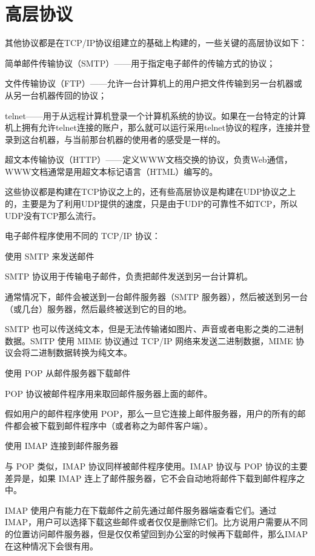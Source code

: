 \section{高层协议}

其他协议都是在TCP/IP协议组建立的基础上构建的，一些关键的高层协议如下：

\begin{compactitem}
\item 简单邮件传输协议（SMTP）——用于指定电子邮件的传输方式的协议；
\item 文件传输协议（FTP）——允许一台计算机上的用户把文件传输到另一台机器或从另一台机器传回的协议；
\item telnet——用于从远程计算机登录一个计算机系统的协议。如果在一台特定的计算机上拥有允许telnet连接的账户，那么就可以运行采用telnet协议的程序，连接并登录到这台机器，与当前那台机器的使用者的感受是一样的。
\item 超文本传输协议（HTTP）——定义WWW文档交换的协议，负责Web通信，WWW文档通常是用超文本标记语言（HTML）编写的。
\end{compactitem}

这些协议都是构建在TCP协议之上的，还有些高层协议是构建在UDP协议之上的，主要是为了利用UDP提供的速度，只是由于UDP的可靠性不如TCP，所以UDP没有TCP那么流行。

电子邮件程序使用不同的 TCP/IP 协议：
\begin{compactitem}
\item 使用 SMTP 来发送邮件

SMTP 协议用于传输电子邮件，负责把邮件发送到另一台计算机。

通常情况下，邮件会被送到一台邮件服务器（SMTP 服务器），然后被送到另一台（或几台）服务器，然后最终被送到它的目的地。

SMTP 也可以传送纯文本，但是无法传输诸如图片、声音或者电影之类的二进制数据。SMTP 使用 MIME 协议通过 TCP/IP 网络来发送二进制数据，MIME 协议会将二进制数据转换为纯文本。
\item 使用 POP 从邮件服务器下载邮件

POP 协议被邮件程序用来取回邮件服务器上面的邮件。

假如用户的邮件程序使用 POP，那么一旦它连接上邮件服务器，用户的所有的邮件都会被下载到邮件程序中（或者称之为邮件客户端）。
\item 使用 IMAP 连接到邮件服务器

与 POP 类似，IMAP 协议同样被邮件程序使用。IMAP 协议与 POP 协议的主要差异是，如果 IMAP 连上了邮件服务器，它不会自动地将邮件下载到邮件程序之中。

IMAP 使用户有能力在下载邮件之前先通过邮件服务器端查看它们。通过 IMAP，用户可以选择下载这些邮件或者仅仅是删除它们。比方说用户需要从不同的位置访问邮件服务器，但是仅仅希望回到办公室的时候再下载邮件，那么IMAP 在这种情况下会很有用。
\end{compactitem}


